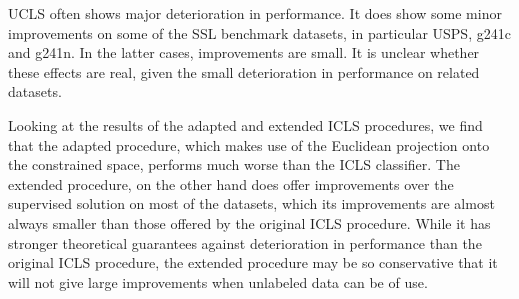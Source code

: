 \documentclass{llncs}
\newcommand{\featdim}{d}
\begin{document}
UCLS often shows major deterioration in performance. It does show some minor improvements on some of the SSL benchmark datasets, in particular USPS, g241c and g241n. In the latter cases, improvements are small. It is unclear whether these effects are real, given the small deterioration in performance on related datasets.

Looking at the results of the adapted and extended ICLS procedures, we find that the adapted procedure, which makes use of the Euclidean projection onto the constrained space, performs much worse than the ICLS classifier. The extended procedure, on the other hand does offer improvements over the supervised solution on most of the datasets, which its improvements are almost always smaller than those offered by the original ICLS procedure. While it has stronger theoretical guarantees against deterioration in performance than the original ICLS procedure, the extended procedure may be so conservative that it will not give large improvements when unlabeled data can be of use.





\end{document}

